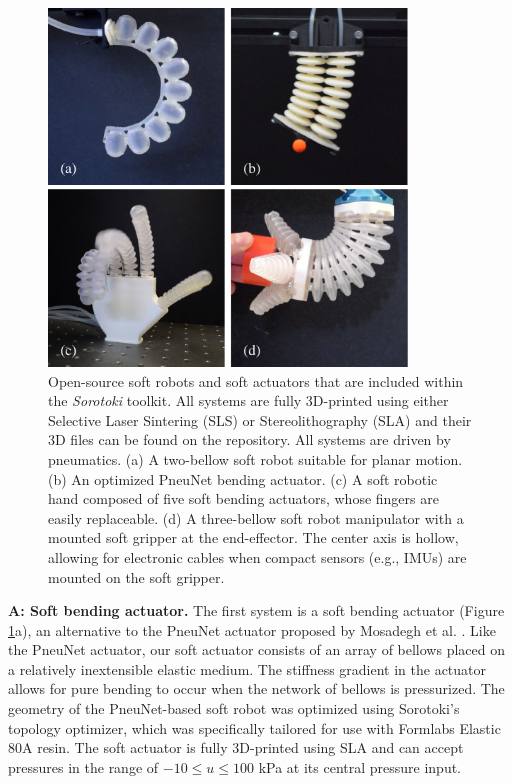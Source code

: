 \begin{figure}[!t]
    \centering
    \includegraphics*[width=0.85\textwidth]{./pdf/thesis-figure-6-1.pdf}
    \caption{Open-source soft robots and soft actuators that are included within the \textit{Sorotoki} toolkit. All systems are fully 3D-printed using either Selective Laser Sintering (SLS) or Stereolithography (SLA) and their 3D files can be found on the repository. All systems are driven by pneumatics. (a) A two-bellow soft robot suitable for planar motion. (b) An optimized PneuNet bending actuator. (c) A soft robotic hand composed of five soft bending actuators, whose fingers are easily replaceable. (d) A three-bellow soft robot manipulator with a mounted soft gripper at the end-effector. The center axis is hollow, allowing for electronic cables when compact sensors (e.g., IMUs) are mounted on the soft gripper.}
    \vspace{-3mm}
    \label{fig:C5:examplebots}
\end{figure}
%  

\textbf{A: Soft bending actuator.} The first system is a soft bending actuator (Figure \ref{fig:C5:examplebots}a), an alternative to the PneuNet actuator proposed by Mosadegh et al. \cite{Mosadegh2014}. Like the PneuNet actuator, our soft actuator consists of an array of bellows placed on a relatively inextensible elastic medium. The stiffness gradient in the actuator allows for pure bending to occur when the network of bellows is pressurized. The geometry of the PneuNet-based soft robot was optimized using Sorotoki's topology optimizer, which was specifically tailored for use with Formlabs Elastic 80A resin. The soft actuator is fully 3D-printed using SLA and can accept pressures in the range of $-10 \le u \le 100$ kPa at its central pressure input. \\

